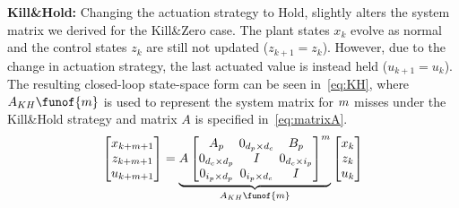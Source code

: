 \textbf{Kill\&Hold: }%
%
Changing the actuation strategy to Hold, slightly alters the system matrix we derived for the Kill\&Zero case.
The plant states $x_k$ evolve as normal and the control states $z_k$ are still not updated ($z_{k+1} = z_k$).
However, due to the change in actuation strategy, the last actuated value is instead held ($u_{k+1} = u_k$).
The resulting closed-loop state-space form can be seen in~\eqref{eq:KH}, where $A_{KH}\funof{\nummisses}$ is used to represent the system matrix for $m$ misses under the Kill\&Hold strategy and matrix $A$ is specified in~\eqref{eq:matrixA}.
%
\begin{equation}
    \setlength\arraycolsep{2pt}
    \label{eq:KH}
    \begin{bmatrix}
        x_{k+\nummisses+1} \\
        z_{k+\nummisses+1} \\
        u_{k+\nummisses+1}
    \end{bmatrix} = 
    \underbrace{ A \begin{bmatrix}
        A_p                                         & 0_{\numstatesplant \times \numstatesctl}  & B_p \\
        0_{\numstatesctl \times \numstatesplant}    & I                                         & 0_{\numstatesctl \times \numinputplant} \\
        0_{\numinputplant \times \numstatesplant}   & 0_{\numinputplant \times \numstatesctl}   & I
    \end{bmatrix}^{\nummisses}}_{A_{KH}\funof{\nummisses}}
    \begin{bmatrix}
        x_{k} \\
        z_{k} \\
        u_{k}
    \end{bmatrix}
\end{equation}

